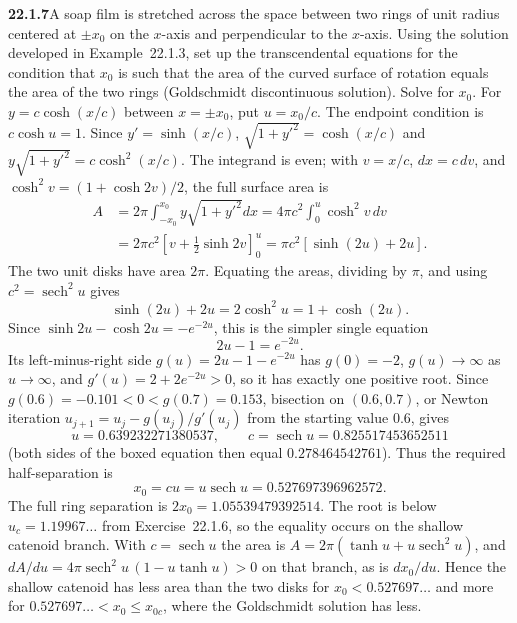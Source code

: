 \par\bigskip
\noindent\textbf{22.1.7}\quad A soap film is stretched across the
space between two rings of unit radius centered at $\pm x_{0}$ on
the $x$-axis and perpendicular to the $x$-axis. Using the
solution developed in Example~22.1.3, set up the transcendental
equations for the condition that $x_{0}$ is such that the area of
the curved surface of rotation equals the area of the two rings
(Goldschmidt discontinuous solution). Solve for $x_{0}$.
\solution
For $y=c\cosh(x/c)$ between $x=\pm x_0$, put $u=x_0/c$.
The endpoint condition is $c\cosh u=1$.
Since $y'=\sinh(x/c)$, $\sqrt{1+y'^2}=\cosh(x/c)$ and
$y\sqrt{1+y'^2}=c\cosh^2(x/c)$. The integrand is even; with $v=x/c$,
$dx=c\,dv$, and $\cosh^2v=(1+\cosh2v)/2$, the full surface area is
\[
\begin{aligned}
A&=2\pi\int_{-x_0}^{x_0}
y\sqrt{1+y'^2}dx
=4\pi c^2\int_0^u\cosh^2v\,dv\\
&=2\pi c^2\left[v+\tfrac12\sinh2v\right]_0^u
=\pi c^2[\sinh(2u)+2u].
\end{aligned}
\]
The two unit disks have area $2\pi$. Equating the areas, dividing by
$\pi$, and using $c^2=\operatorname{sech}^2u$ gives
\[
\sinh(2u)+2u=2\cosh^2u=1+\cosh(2u).
\]
Since $\sinh2u-\cosh2u=-e^{-2u}$, this is the simpler single equation
\[
\boxed{2u-1=e^{-2u}}.
\]
Its left-minus-right side $g(u)=2u-1-e^{-2u}$ has $g(0)=-2$,
$g(u)\to\infty$ as $u\to\infty$, and $g'(u)=2+2e^{-2u}>0$, so it has
exactly one positive root. Since $g(0.6)=-0.101<0<g(0.7)=0.153$,
bisection on $(0.6,0.7)$, or Newton iteration
$u_{j+1}=u_j-g(u_j)/g'(u_j)$ from the starting value $0.6$, gives
\[
u=0.639232271380537,\qquad
c=\operatorname{sech}u=0.825517453652511
\]
(both sides of the boxed equation then equal $0.278464542761$).
Thus the required half-separation is
\[
\boxed{x_0=cu=u\operatorname{sech}u=0.527697396962572}.
\]
The full ring separation is $2x_0=1.05539479392514$.
The root is below $u_c=1.19967\ldots$ from Exercise~22.1.6, so the
equality occurs on the shallow catenoid branch. With
$c=\operatorname{sech}u$ the area
is $A=2\pi(\tanh u+u\operatorname{sech}^2u)$, and
$dA/du=4\pi\operatorname{sech}^2u\,(1-u\tanh u)>0$ on that branch, as
is $dx_0/du$. Hence the shallow catenoid has less area than the two
disks for $x_0<0.527697\ldots$ and more for
$0.527697\ldots<x_0\le x_{0c}$, where the Goldschmidt solution has less.


